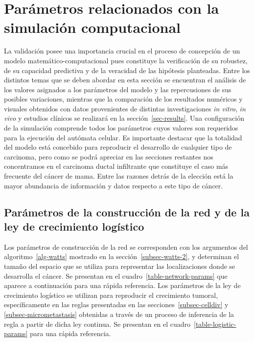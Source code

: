 \chapter{Par\'ametros relacionados con la simulaci\'on computacional}
\label{sec-validation}
La validaci\'on posee una importancia crucial en el proceso de concepci\'on de un modelo matem\'atico-computacional pues constituye la verificaci\'on de su robustez, de su capacidad predictiva y de la veracidad de las hip\'otesis planteadas. Entre los distintos temas que se deben abordar en esta secci\'on se encuentran el an\'alisis de los valores asignados a los par\'ametros del modelo y las repercusiones de sus posibles variaciones, mientras que la comparaci\'on de los resultados num\'ericos y visuales obtenidos con datos provenientes de distintas investigaciones \textit{in vitro}, \textit{in vivo} y estudios cl\'inicos se realizar\'a en la secci\'on~\ref{sec-results}. Una configuraci\'on de la simulaci\'on comprende todos los par\'ametros cuyos valores son requeridos para la ejecuci\'on del aut\'omata celular. Es importante destacar que la totalidad del modelo est\'a concebido para reproducir el desarrollo de cualquier tipo de carcinoma, pero como se podr\'a apreciar en las secciones restantes nos concentramos en el carcinoma ductal infiltrante que constituye el caso m\'as frecuente del c\'ancer de mama. Entre las razones detr\'as de la elecci\'on est\'a la mayor abundancia de informaci\'on y datos respecto a este tipo de c\'ancer.

\section{Par\'ametros de la construcci\'on de la red y de la ley de crecimiento log\'istico}
\label{subsec-network-param}
Los par\'ametros de construcci\'on de la red se corresponden con los argumentos del algoritmo~\ref{alg-watts} mostrado en la secci\'on~\ref{subsec-watts-2}, y determinan el tama\~no del espacio que se utiliza para representar las localizaciones donde se desarrolla el c\'ancer. Se presentan en el cuadro~\ref{table-network-params} que aparece a continuaci\'on para una r\'apida referencia. Los par\'ametros de la ley de crecimiento log\'istico se utilizan para reproducir el crecimiento tumoral, espec\'ificamente en las reglas presentadas en las secciones~\ref{subsec-celldiv} y \ref{subsec-micrometastasis} obtenidas a trav\'es de un proceso de inferencia de la regla a partir de dicha ley continua. Se presentan en el cuadro~\ref{table-logistic-params} para una r\'apida referencia.

